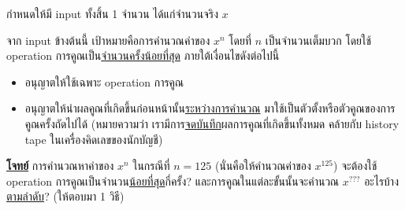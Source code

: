 \question{}

กำหนดให้มี input ทั้งสิ้น 1 จำนวน ได้แก่จำนวนจริง $x$

จาก input ข้างต้นนี้ เป้าหมายคือการคำนวณค่าของ $x^n$ โดยที่ $n$ เป็นจำนวนเต็มบวก  
โดยใช้ operation การคูณเป็น\uline{จำนวนครั้งน้อยที่สุด} ภายใต้เงื่อนไขดังต่อไปนี้
\begin{itemize}
\item อนุญาตให้ใช้เฉพาะ operation การคูณ
\item อนุญาตให้นำผลคูณที่เกิดขึ้นก่อนหน้านั้น\uline{ระหว่างการคำนวณ}
    มาใช้เป็นตัวตั้งหรือตัวคูณของการคูณครั้งถัดไปได้\hrsp%
    (หมายความว่า เรามีการ\uline{จดบันทึก}ผลการคูณที่เกิดขึ้นทั้งหมด 
    คล้ายกับ history tape ในเครื่องคิดเลขของนักบัญชี)
\end{itemize}

\noindent
\textbf{\uline{โจทย์}} การคำนวณหาค่าของ $x^n$ ในกรณีที่ $n=\mathrm{125}$ 
(นั่นคือให้คำนวณค่าของ $x^\mathrm{125}$) จะต้องใช้ operation การคูณเป็นจำนวน\uline{น้อยที่สุด}กี่ครั้ง? 
และการคูณในแต่ละขั้นนั้นจะคำนวณ $x^{???}$ อะไรบ้าง\uline{ตามลำดับ}?\; (ให้ตอบมา 1 วิธี)
